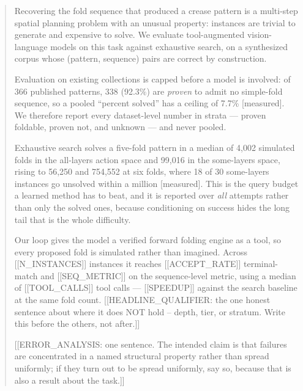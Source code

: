 \begin{abstract}
Recovering the fold sequence that produced a crease pattern is a multi-step spatial planning
problem with an unusual property: instances are trivial to generate and expensive to solve.
We evaluate tool-augmented vision-language models on this task against exhaustive search, on a
synthesized corpus whose (pattern, sequence) pairs are correct by construction.

Evaluation on existing collections is capped before a model is involved: of 366 published
patterns, 338 (92.3\%) are \emph{proven} to admit no simple-fold sequence, so a pooled
``percent solved'' has a ceiling of 7.7\% [measured]. We therefore report every dataset-level
number in strata --- proven foldable, proven not, and unknown --- and never pooled.

Exhaustive search solves a five-fold pattern in a median of 4{,}002 simulated folds in the
all-layers action space and 99{,}016 in the some-layers space, rising to 56{,}250 and 754{,}552
at six folds, where 18 of 30 some-layers instances go unsolved within a million [measured].
This is the query budget a learned method has to beat, and it is reported over \emph{all}
attempts rather than only the solved ones, because conditioning on success hides the long tail
that is the whole difficulty.

Our loop gives the model a verified forward folding engine as a tool, so every proposed fold is
simulated rather than imagined. Across [[N_INSTANCES]] instances it reaches [[ACCEPT_RATE]]
terminal-match and [[SEQ_METRIC]] on the sequence-level metric, using a median of
[[TOOL_CALLS]] tool calls --- [[SPEEDUP]] against the search baseline at the same fold count.
[[HEADLINE_QUALIFIER: the one honest sentence about where it does NOT hold -- depth, tier, or
stratum. Write this before the others, not after.]]

[[ERROR_ANALYSIS: one sentence. The intended claim is that failures are concentrated in a named
structural property rather than spread uniformly; if they turn out to be spread uniformly, say
so, because that is also a result about the task.]]
\end{abstract}
